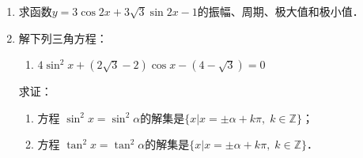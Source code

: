 \begin{enumerate}
\item 求函数$y=3\cos 2x+3\sqrt{3}\sin 2x-1$的振幅、周期、极大值和极小值．
\item 解下列三角方程：
 \begin{enumerate}
\item $4\sin ^{2} x+(2 \sqrt{3}-2) \cos x-(4-\sqrt{3})=0$
\end{enumerate}   

\staritem 求证：
\begin{enumerate}
    \item 方程 $\sin^2x=\sin^2\alpha$的解集是$\{x|x=\pm \alpha+k\pi,\; k\in\mathbb{Z}\}$；
    \item 方程 $\tan^2x=\tan^2\alpha$的解集是$\{x|x=\pm \alpha+k\pi,\; k\in\mathbb{Z}\}$．
\end{enumerate}
\end{enumerate}